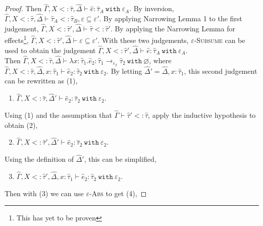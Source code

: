 \documentclass{llncs}
\newcommand{\keywadj}[1]{\mathtt{#1}}
\newcommand{\keyw}[1]{\keywadj{#1}~}
\newcommand{\kw}[1]{\keyw{ #1 }}
\begin{document}
\begin{proof}
 Then $\hat \Gamma, X <: \hat \tau, \hat \Delta \vdash \hat e: \hat \tau_A~\kw{with} \varepsilon_A$. By inversion, $\hat \Gamma, X <: \hat \tau, \hat \Delta \vdash \hat \tau_A <: \hat \tau_B, \varepsilon \subseteq \varepsilon'$. By applying Narrowing Lemma 1 to the first judgement, $\hat \Gamma, X <: \hat \tau', \hat \Delta \vdash \hat \tau <: \hat \tau'$. By applying the Narrowing Lemma for effects\footnote{This has yet to be proven}, $\hat \Gamma, X <: \hat \tau', \hat \Delta \vdash \varepsilon \subseteq \varepsilon'$. With these two judgements, \textsc{$\varepsilon$-Subsume} can be used to obtain the judgement $\hat \Gamma, X <: \hat \tau', \hat \Delta \vdash \hat e: \hat \tau_A~\kw{with} \varepsilon_A$.\\

 Then $\hat \Gamma, X <: \hat \tau, \hat \Delta \vdash \lambda x: \hat \tau_1. \hat e_2 : \hat \tau_1 \rightarrow_{\varepsilon_2} \hat \tau_2~\kw{with} \varnothing$, where $\hat \Gamma, X<: \hat \tau, \hat \Delta, x: \hat \tau_1 \vdash \hat e_2: \hat \tau_2~\kw{with} \varepsilon_2$. By letting $\hat \Delta' = \hat \Delta, x: \hat \tau_1$, this second judgement can be rewritten as (1),

\begin{enumerate}
	\item $\hat \Gamma, X <: \hat \tau, \hat \Delta' \vdash \hat e_2: \hat \tau_2~\kw{with} \varepsilon_2$. 
\end{enumerate}

Using (1) and the assumption that $\hat \Gamma \vdash \hat \tau' <: \hat \tau$, apply the inductive hypothesis to obtain (2),

\begin{enumerate}
	\setcounter{enumi}{1}
	\item $\hat \Gamma, X <: \hat \tau', \hat \Delta' \vdash \hat e_2: \hat \tau_2~\kw{with} \varepsilon_2$.
\end{enumerate}

Using the definition of $\hat \Delta'$, this can be simplified,

\begin{enumerate}
	\setcounter{enumi}{2}
	\item $\hat \Gamma, X <: \hat \tau', \hat \Delta, x: \hat \tau_1 \vdash \hat e_2: \hat \tau_2~\kw{with} \varepsilon_2$.
\end{enumerate}

Then with (3) we can use \textsc{$\varepsilon$-Abs} to get (4),


\end{proof}
\end{document}
